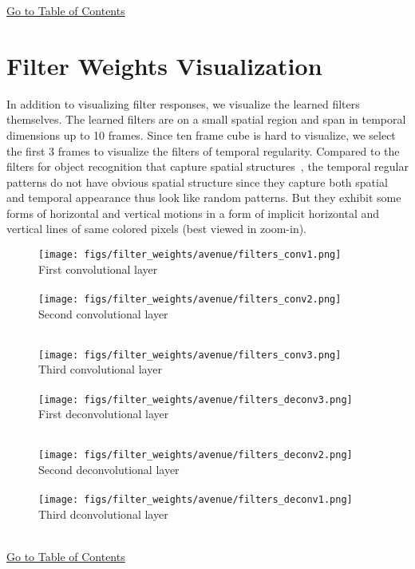 \documentclass[10pt,twocolumn,letterpaper]{article}
\begin{document}
\begin{center}
	\hyperlink{page.11}{Go to Table of Contents}
\end{center}

\clearpage 

\section{Filter Weights Visualization}
\label{sec:filter_w_vis}
In addition to visualizing filter responses, we visualize the learned filters themselves.
The learned filters are on a small spatial region and span in temporal dimensions up to 10 frames.
Since ten frame cube is hard to visualize, we select the first 3 frames to visualize the filters of temporal regularity.
Compared to the filters for object recognition that capture spatial structures~\cite{zeilerF13}, the temporal regular patterns do not have obvious spatial structure since they capture both spatial and temporal appearance thus look like random patterns.
But they exhibit some forms of horizontal and vertical motions in a form of implicit horizontal and vertical lines of same colored pixels (best viewed in zoom-in).

\begin{figure}[h]
	\centering
	\texttt{[image: figs/filter\_weights/avenue/filters\_conv1.png]}\\
	First convolutional layer \\
	~\\
	\texttt{[image: figs/filter\_weights/avenue/filters\_conv2.png]}\\
	Second convolutional layer \\
	~\\
\end{figure}

\begin{figure}[h]
	\centering
	\texttt{[image: figs/filter\_weights/avenue/filters\_conv3.png]}\\
	Third convolutional layer \\
	~\\
	\texttt{[image: figs/filter\_weights/avenue/filters\_deconv3.png]}\\
	First deconvolutional layer \\
	~\\
\end{figure}

\begin{figure}[h]
	\centering
	\texttt{[image: figs/filter\_weights/avenue/filters\_deconv2.png]}\\
	Second deconvolutional layer \\
	~\\
	\texttt{[image: figs/filter\_weights/avenue/filters\_deconv1.png]}\\
	Third dconvolutional layer \\
	~\\
\end{figure}


\begin{center}
	\hyperlink{page.11}{Go to Table of Contents}
\end{center}

\clearpage 
\end{document}
